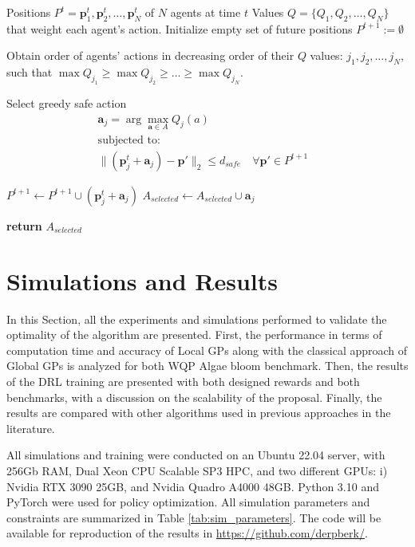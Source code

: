 \documentclass[journal]{IEEEtran}
\newcommand\vect[1]{\boldsymbol{#1}}
\begin{document}
\begin{algorithm}
\caption{SafeConsensus algorithm}
\label{alg:safe_consensus}
\begin{algorithmic}[1]

\Require  Positions $P^t={\vect{p}^t_1,\vect{p}^t_2,\ldots,\vect{p}^t_N}$ of $N$ agents at time $t$
\Require Values $Q = \{Q_1,Q_2,\ldots,Q_N\}$ that weight each agent's action.
\State Initialize empty set of future positions $P^{t+1} := \emptyset$

\State Obtain order of agents' actions in decreasing order of their $Q$ values: $j_1,j_2,\ldots,j_N$, such that $\max Q_{j_1} \ge \max Q_{j_2} \ge \ldots \ge \max Q_{j_N}$.

    \State Select greedy safe action
        \[
        \begin{aligned}
            \vect{a}_j = \arg\max_{\vect{a}\in A} Q_j(a) \\
            \text{subjected to:} \\
            \|(\vect{p}^t_j + \vect{a}_j) - \vect{p}'\|_2 \leq d_{safe} \quad \forall \vect{p}' \in P^{t+1} &
        \end{aligned}
        \]

    \State $P^{t+1} \leftarrow P^{t+1} \cup (\vect{p}^t_j + \vect{a}_j)$ 
    \State $A_{selected} \leftarrow A_{selected} \cup {\vect{a}_j}$ 
\EndFor

\State \textbf{return} $A_{selected}$
\end{algorithmic}
\end{algorithm}

\section{Simulations and Results}

In this Section, all the experiments and simulations performed to validate the optimality of the algorithm are presented. First, the performance in terms of computation time and accuracy of Local GPs along with the classical approach of Global GPs is analyzed for both WQP Algae bloom benchmark. Then, the results of the DRL training are presented with both designed rewards and both benchmarks, with a discussion on the scalability of the proposal. Finally, the results are compared with other algorithms used in previous approaches in the literature.

All simulations and training were conducted on an Ubuntu 22.04 server, with 256Gb RAM, Dual Xeon CPU Scalable SP3 HPC, and two different GPUs: i) Nvidia RTX 3090 25GB, and Nvidia Quadro A4000 48GB. Python 3.10 and PyTorch were used for policy optimization. All simulation parameters and constraints are summarized in Table \ref{tab:sim_parameters}. The code will be available for reproduction of the results in \url{https://github.com/derpberk/}.
\end{document}
